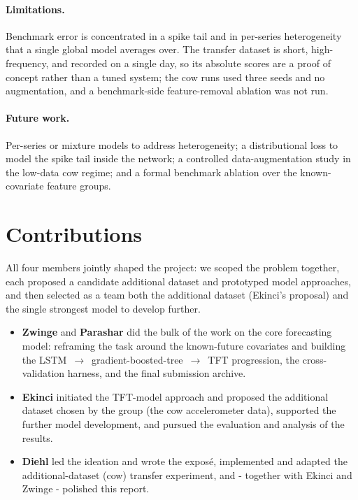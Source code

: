 \documentclass[11pt]{article}
\begin{document}
\paragraph{Limitations.} Benchmark error is concentrated in a spike tail and in per-series
heterogeneity that a single global model averages over. The transfer dataset is short, high-frequency,
and recorded on a single day, so its absolute scores are a proof of concept rather than a tuned
system; the cow runs used three seeds and no augmentation, and a benchmark-side feature-removal
ablation was not run.

\paragraph{Future work.} Per-series or mixture models to address heterogeneity; a distributional loss
to model the spike tail inside the network; a controlled data-augmentation study in the low-data cow
regime; and a formal benchmark ablation over the known-covariate feature groups.

\section*{Contributions}
All four members jointly shaped the project: we scoped the problem together, each proposed a candidate
additional dataset and prototyped model approaches, and then selected as a team both the additional
dataset (Ekinci's proposal) and the single strongest model to develop further.
\newline
\begin{itemize}[nosep,leftmargin=1.5em]
  \item \textbf{Zwinge} and \textbf{Parashar} did the bulk of the work on the core forecasting model:
  reframing the task around the known-future covariates and building the
  LSTM~$\to$~gradient-boosted-tree~$\to$~TFT progression, the cross-validation harness, and the final
  submission archive.
  \item \textbf{Ekinci} initiated the TFT-model approach and proposed the additional dataset chosen by the group (the cow accelerometer
  data), supported the further model development, and pursued the evaluation and analysis of the results.
  \item \textbf{Diehl} led the ideation and wrote the exposé, implemented and adapted the additional-dataset (cow) transfer experiment,
  and - together with Ekinci and Zwinge - polished this report.
\end{itemize}
\end{document}
